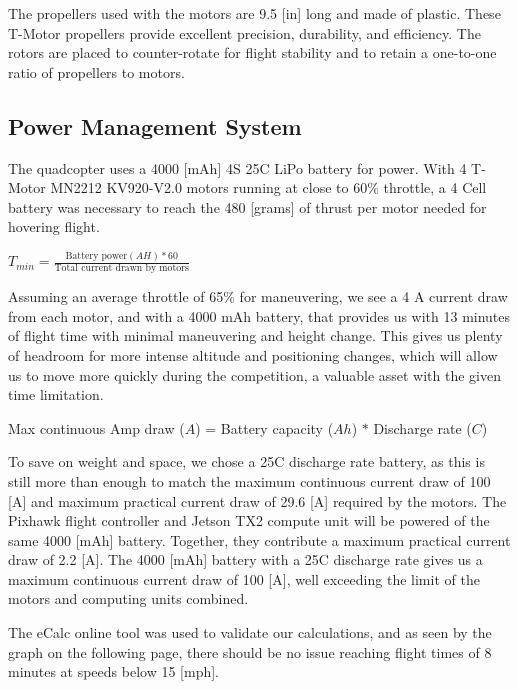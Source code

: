 \documentclass[12pt,letterpaper]{article}
\begin{document}
The propellers used with the motors are 9.5 [in] long and made of plastic. These T-Motor propellers provide excellent precision, durability, and efficiency. The rotors are placed to counter-rotate for flight stability and to retain a one-to-one ratio of propellers to motors.

	\subsection*{Power Management System}
The quadcopter uses a 4000 [mAh] 4S 25C LiPo battery for power. With 4 T-Motor MN2212 KV920-V2.0 motors running at close to 60\% throttle, a 4 Cell battery was necessary to reach the 480 [grams] of thrust per motor needed for hovering flight.
\begin{center}
	$T_{min} = \frac{\text{Battery power}(AH) * 60}{\text{Total current drawn by motors}}$
\end{center}

Assuming an average throttle of 65\% for maneuvering, we see a 4 A current draw from each motor, and with a 4000 mAh battery, that provides us with 13 minutes of flight time with minimal maneuvering and height change. This gives us plenty of headroom for more intense altitude and positioning changes, which will allow us to move more quickly during the competition, a valuable asset with the given time limitation.
\begin{center}
	Max continuous Amp draw ($A$) = Battery capacity ($Ah$) $*$ Discharge rate ($C$)
\end{center}

To save on weight and space, we chose a 25C discharge rate battery, as this is still more than enough to match the maximum continuous current draw of 100 [A] and maximum practical current draw of 29.6 [A] required by the motors. The Pixhawk flight controller and Jetson TX2 compute unit will be powered of the same 4000 [mAh] battery. Together, they contribute a maximum practical current draw of 2.2 [A]. The 4000 [mAh] battery with a 25C discharge rate gives us a maximum continuous current draw of 100 [A], well exceeding the limit of the motors and computing units combined.

The eCalc online tool was used to validate our calculations, and as seen by the graph on the following page, there should be no issue reaching flight times of 8 minutes at speeds below 15 [mph].
\end{document}
